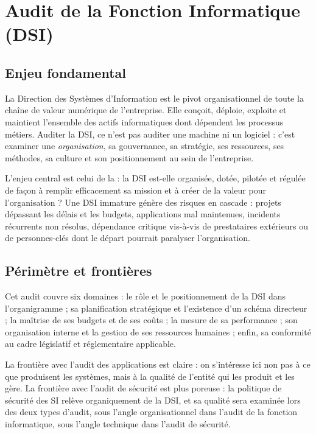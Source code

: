 \section{Audit de la Fonction Informatique (DSI)}

\subsection{Enjeu fondamental}

La Direction des Systèmes d'Information est le pivot organisationnel de toute la chaîne de valeur numérique de l'entreprise. Elle conçoit, déploie, exploite et maintient l'ensemble des actifs informatiques dont dépendent les processus métiers. Auditer la DSI, ce n'est pas auditer une machine ni un logiciel : c'est examiner une \textit{organisation}, sa gouvernance, sa stratégie, ses ressources, ses méthodes, sa culture et son positionnement au sein de l'entreprise.

L'enjeu central est celui de la  : la DSI est-elle organisée, dotée, pilotée et régulée de façon à remplir efficacement sa mission et à créer de la valeur pour l'organisation ? Une DSI immature génère des risques en cascade : projets dépassant les délais et les budgets, applications mal maintenues, incidents récurrents non résolus, dépendance critique vis-à-vis de prestataires extérieurs ou de personnes-clés dont le départ pourrait paralyser l'organisation.

\subsection{Périmètre et frontières}

Cet audit couvre six domaines : le rôle et le positionnement de la DSI dans l'organigramme ; sa planification stratégique et l'existence d'un schéma directeur ; la maîtrise de ses budgets et de ses coûts ; la mesure de sa performance ; son organisation interne et la gestion de ses ressources humaines ; enfin, sa conformité au cadre législatif et réglementaire applicable.

La frontière avec l'audit des applications est claire : on s'intéresse ici non pas à ce que produisent les systèmes, mais à la qualité de l'entité qui les produit et les gère. La frontière avec l'audit de sécurité est plus poreuse : la politique de sécurité des SI relève organiquement de la DSI, et sa qualité sera examinée lors des deux types d'audit, sous l'angle organisationnel dans l'audit de la fonction informatique, sous l'angle technique dans l'audit de sécurité.

